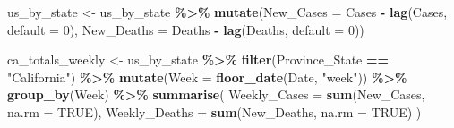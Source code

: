 \documentclass[
]{article}
\newenvironment{Shaded}{\begin{snugshade}}{\end{snugshade}}
\newcommand{\AttributeTok}[1]{\textcolor[rgb]{0.13,0.29,0.53}{#1}}
\newcommand{\ConstantTok}[1]{\textcolor[rgb]{0.56,0.35,0.01}{#1}}
\newcommand{\DecValTok}[1]{\textcolor[rgb]{0.00,0.00,0.81}{#1}}
\newcommand{\FunctionTok}[1]{\textcolor[rgb]{0.13,0.29,0.53}{\textbf{#1}}}
\newcommand{\NormalTok}[1]{#1}
\newcommand{\OtherTok}[1]{\textcolor[rgb]{0.56,0.35,0.01}{#1}}
\newcommand{\SpecialCharTok}[1]{\textcolor[rgb]{0.81,0.36,0.00}{\textbf{#1}}}
\newcommand{\StringTok}[1]{\textcolor[rgb]{0.31,0.60,0.02}{#1}}
\begin{document}
\begin{Shaded}
\begin{Highlighting}[]
\NormalTok{us\_by\_state }\OtherTok{\textless{}{-}}\NormalTok{ us\_by\_state }\SpecialCharTok{\%\textgreater{}\%}
  \FunctionTok{mutate}\NormalTok{(}\AttributeTok{New\_Cases =}\NormalTok{ Cases }\SpecialCharTok{{-}} \FunctionTok{lag}\NormalTok{(Cases, }\AttributeTok{default =} \DecValTok{0}\NormalTok{),}
         \AttributeTok{New\_Deaths =}\NormalTok{ Deaths }\SpecialCharTok{{-}} \FunctionTok{lag}\NormalTok{(Deaths, }\AttributeTok{default =} \DecValTok{0}\NormalTok{))}

\NormalTok{ca\_totals\_weekly }\OtherTok{\textless{}{-}}\NormalTok{ us\_by\_state }\SpecialCharTok{\%\textgreater{}\%}
  \FunctionTok{filter}\NormalTok{(Province\_State }\SpecialCharTok{==} \StringTok{"California"}\NormalTok{) }\SpecialCharTok{\%\textgreater{}\%}
  \FunctionTok{mutate}\NormalTok{(}\AttributeTok{Week =} \FunctionTok{floor\_date}\NormalTok{(Date, }\StringTok{"week"}\NormalTok{)) }\SpecialCharTok{\%\textgreater{}\%}
  \FunctionTok{group\_by}\NormalTok{(Week) }\SpecialCharTok{\%\textgreater{}\%}
  \FunctionTok{summarise}\NormalTok{(}
    \AttributeTok{Weekly\_Cases =} \FunctionTok{sum}\NormalTok{(New\_Cases, }\AttributeTok{na.rm =} \ConstantTok{TRUE}\NormalTok{),}
    \AttributeTok{Weekly\_Deaths =} \FunctionTok{sum}\NormalTok{(New\_Deaths, }\AttributeTok{na.rm =} \ConstantTok{TRUE}\NormalTok{)}
\NormalTok{  )}


\end{Highlighting}
\end{Shaded}
\end{document}

